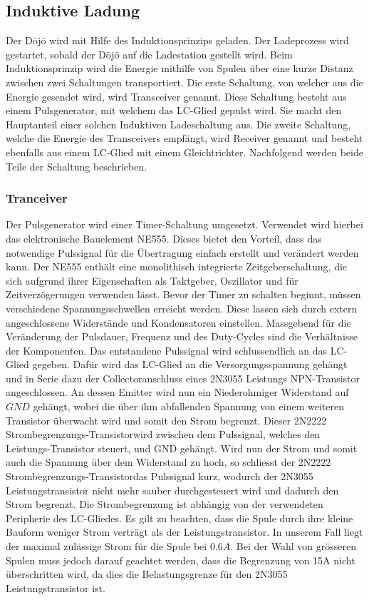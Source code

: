 \subsection{Induktive Ladung}\label{sec:energieuebertragung}

Der Dōjō wird mit Hilfe des Induktionsprinzips geladen. Der Ladeprozess wird gestartet, sobald der Dōjō auf die Ladestation gestellt wird. Beim Induktionsprinzip wird die Energie mithilfe von Spulen über eine kurze Distanz zwischen zwei Schaltungen transportiert. Die erste Schaltung, von welcher aus die Energie gesendet wird, wird Transceiver genannt. Diese Schaltung besteht aus einem Pulsgenerator, mit welchem das LC-Glied gepulst wird. Sie macht den Hauptanteil einer solchen Induktiven Ladeschaltung aus. Die zweite Schaltung, welche die Energie des Transceivers empfängt, wird Receiver genannt und besteht ebenfalls aus einem LC-Glied mit einem Gleichtrichter. Nachfolgend werden beide Teile der Schaltung beschrieben.

\subsubsection*{Tranceiver}
Der Pulsgenerator wird einer Timer-Schaltung umgesetzt. Verwendet wird hierbei das elektronische Bauelement NE555. Dieses bietet den Vorteil, dass das notwendige Pulssignal für die Übertragung einfach erstellt und verändert werden kann. Der NE555 enthält eine monolithisch integrierte Zeitgeberschaltung, die sich aufgrund ihrer Eigenschaften als Taktgeber, Oszillator und für Zeitverzögerungen verwenden lässt. Bevor der Timer zu schalten beginnt, müssen verschiedene Spannungsschwellen erreicht werden. Diese lassen sich durch extern angeschlossene Widerstände und Kondensatoren einstellen. Massgebend für die Veränderung der Pulsdauer, Frequenz und des Duty-Cycles sind die Verhältnisse der Komponenten. Das entstandene Pulssignal wird schlussendlich an das LC-Glied gegeben. Dafür wird das LC-Glied an die Versorgungsspannung gehängt und in Serie dazu der Collectoranschluss eines 2N3055 Leistungs NPN-Transistor angeschlossen. An dessen Emitter wird nun ein Niederohmiger Widerstand auf $GND$ gehängt, wobei die über ihm abfallenden Spannung von einem weiteren Transistor überwacht wird und somit den Strom begrenzt. Dieser \glqq 2N2222 Strombegrenzungs-Transistor\grqq wird zwischen dem Pulssignal, welches den Leistungs-Transistor steuert, und GND gehängt. Wird nun der Strom und somit auch die Spannung über dem Widerstand zu hoch, so schliesst der \glqq 2N2222 Strombegrenzungs-Transistor\grqq das Pulssignal kurz, wodurch der 2N3055 Leistungstransistor nicht mehr sauber durchgesteuert wird und dadurch den Strom begrenzt. Die Strombegrenzung ist abhängig von der verwendeten Peripherie des LC-Gliedes. Es gilt zu beachten, dass die Spule durch ihre kleine Bauform weniger Strom verträgt als der Leistungstransistor. In unserem Fall liegt der maximal zulässige Strom für die Spule bei $0.6A$. Bei der Wahl von grösseren Spulen muss jedoch darauf geachtet werden, dass die Begrenzung von 15A nicht überschritten wird, da dies die Belastungsgrenze für den 2N3055 Leistungstransistor ist.

